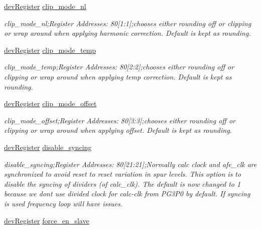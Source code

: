 \begin{DoxyCompactItemize}
\mbox{\hyperlink{classdev_register}{dev\+Register}} \mbox{\hyperlink{class_o_p_t3101_registers_a8fe822abe308283298bd3fbbc718bedc}{clip\+\_\+mode\+\_\+nl}}
\begin{DoxyCompactList}\small\item\em clip\+\_\+mode\+\_\+nl;Register Addresses\+: 80\mbox{[}1\+:1\mbox{]};chooses either rounding off or clipping or wrap around when applying harmonic correction. Default is kept as rounding. \end{DoxyCompactList}\item 
\mbox{\hyperlink{classdev_register}{dev\+Register}} \mbox{\hyperlink{class_o_p_t3101_registers_aaa1fef08b55df1b2d7a8743e31c4dc74}{clip\+\_\+mode\+\_\+temp}}
\begin{DoxyCompactList}\small\item\em clip\+\_\+mode\+\_\+temp;Register Addresses\+: 80\mbox{[}2\+:2\mbox{]};chooses either rounding off or clipping or wrap around when applying temp correction. Default is kept as rounding. \end{DoxyCompactList}\item 
\mbox{\hyperlink{classdev_register}{dev\+Register}} \mbox{\hyperlink{class_o_p_t3101_registers_a4b970776cd18ff32126be0411e2a3acf}{clip\+\_\+mode\+\_\+offset}}
\begin{DoxyCompactList}\small\item\em clip\+\_\+mode\+\_\+offset;Register Addresses\+: 80\mbox{[}3\+:3\mbox{]};chooses either rounding off or clipping or wrap around when applying offset. Default is kept as rounding. \end{DoxyCompactList}\item 
\mbox{\hyperlink{classdev_register}{dev\+Register}} \mbox{\hyperlink{class_o_p_t3101_registers_a0204cc868b4e5930fb53478f73f83773}{disable\+\_\+syncing}}
\begin{DoxyCompactList}\small\item\em disable\+\_\+syncing;Register Addresses\+: 80\mbox{[}21\+:21\mbox{]};Normally calc clock and afe\+\_\+clk are synchronized to avoid reset to reset variation in spur levels. This option is to disable the syncing of dividers (of calc\+\_\+clk). The default is now changed to \textquotesingle{}1\textquotesingle{} because we don\textquotesingle{}t use divided clock for calc-\/clk from P\+G3\+P0 by default. If syncing is used frequency loop will have issues. \end{DoxyCompactList}\item 
\mbox{\hyperlink{classdev_register}{dev\+Register}} \mbox{\hyperlink{class_o_p_t3101_registers_abc76d3073b34202e3d2029f6777e63d3}{force\+\_\+en\+\_\+slave}}

\end{DoxyCompactItemize}
